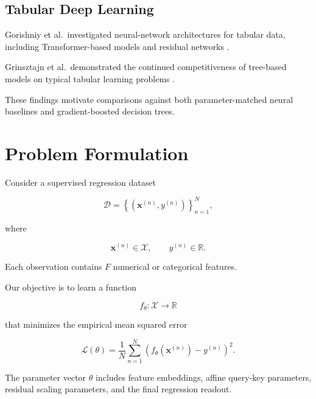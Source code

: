 \documentclass[11pt,a4paper]{article}
\newcommand{\R}{\mathbb{R}}
\begin{document}
\subsection{Tabular Deep Learning}

Gorishniy et al.\ investigated neural-network
architectures for tabular data, including
Transformer-based models and residual networks
\cite{gorishniy2021tabular}.

Grinsztajn et al.\ demonstrated the continued
competitiveness of tree-based models on typical
tabular learning problems
\cite{grinsztajn2022trees}.

These findings motivate comparisons against
both parameter-matched neural baselines and
gradient-boosted decision trees.

\section{Problem Formulation}

Consider a supervised regression dataset

\begin{equation}
\mathcal{D}
=
\left\{
(\mathbf{x}^{(n)},y^{(n)})
\right\}_{n=1}^{N},
\end{equation}

where

\begin{equation}
\mathbf{x}^{(n)}\in\mathcal{X},
\qquad
y^{(n)}\in\R.
\end{equation}

Each observation contains $F$ numerical
or categorical features.

Our objective is to learn a function

\begin{equation}
f_\theta:\mathcal{X}\rightarrow\R
\end{equation}

that minimizes the empirical mean squared error

\begin{equation}
\mathcal{L}(\theta)
=
\frac{1}{N}
\sum_{n=1}^{N}
\left(
f_\theta(\mathbf{x}^{(n)})
-y^{(n)}
\right)^2.
\end{equation}

The parameter vector $\theta$ includes
feature embeddings, affine query-key parameters,
residual scaling parameters, and the
final regression readout.
\end{document}
